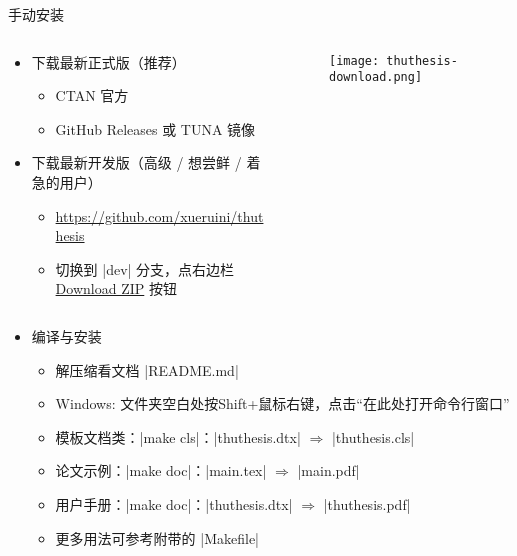 \begin{frame}[fragile]{手动安装\ThuThesis{}}
      \begin{columns}
        \begin{column}{.7\textwidth}
  \begin{itemize}
    \item 下载最新正式版（推荐）
      \begin{itemize}
        \item CTAN 官方 
        \item GitHub Releases  或 TUNA 镜像 
      \end{itemize}
    \item 下载最新开发版（高级 / 想尝鲜 / 着急的用户）
      \begin{itemize}
        \item \url{https://github.com/xueruini/thuthesis}
        \item 切换到 |dev| 分支，点右边栏
          \href{https://github.com/xueruini/thuthesis/archive/dev.zip}%
          {Download ZIP} 按钮
      \end{itemize}
  \end{itemize}
        \end{column}
        \begin{column}{.3\textwidth}
          \begin{figure}[htbp]
            \centering
            \texttt{[image: thuthesis-download.png]}
          \end{figure}
        \end{column}
      \end{columns}
  \begin{itemize}
    \item 编译与安装
      \begin{itemize}
        \item 解压缩看文档 |README.md|
        \item Windows: 文件夹空白处按Shift+鼠标右键，点击``在此处打开命令行窗口''
        \item 模板文档类：|make cls|：|thuthesis.dtx| $\Rightarrow$
          |thuthesis.cls|
        \item 论文示例：|make doc|：|main.tex| $\Rightarrow$
        |main.pdf|
        \item 用户手册：|make doc|：|thuthesis.dtx| $\Rightarrow$
          |thuthesis.pdf|
        \item 更多用法可参考附带的 |Makefile|
      \end{itemize}
  \end{itemize}
\end{frame}

